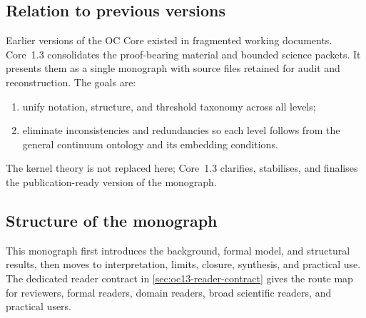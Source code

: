 \subsection{Relation to previous versions}

Earlier versions of the OC Core existed in fragmented working documents.
Core~1.3 consolidates the proof-bearing material and bounded science packets.
It presents them as a single monograph with source files retained for audit and
reconstruction. The goals are:

\begin{enumerate}
    \item unify notation, structure, and threshold taxonomy across all levels;
    \item eliminate inconsistencies and redundancies so each level follows from the general continuum ontology and its embedding conditions.
\end{enumerate}

The kernel theory is not replaced here; Core~1.3 clarifies, stabilises, and
finalises the publication-ready version of the monograph.

\subsection{Structure of the monograph}

This monograph first introduces the background, formal model, and structural
results, then moves to interpretation, limits, closure, synthesis, and
practical use. The dedicated reader contract in
\cref{sec:oc13-reader-contract} gives the route map for reviewers,
formal readers, domain readers, broad scientific readers, and practical
users.
